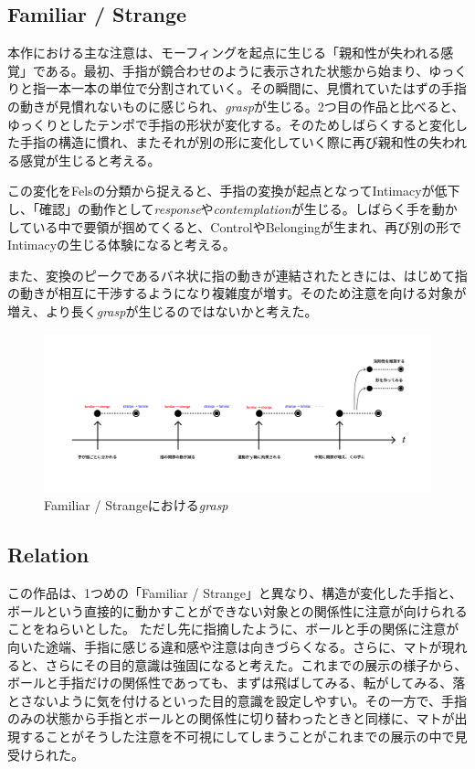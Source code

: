 \subsection*{Familiar / Strange}
本作における主な注意は、モーフィングを起点に生じる「親和性が失われる感覚」である。最初、手指が鏡合わせのように表示された状態から始まり、ゆっくりと指一本一本の単位で分割されていく。その瞬間に、見慣れていたはずの手指の動きが見慣れないものに感じられ、\textit{grasp}が生じる。2つ目の作品と比べると、ゆっくりとしたテンポで手指の形状が変化する。そのためしばらくすると変化した手指の構造に慣れ、またそれが別の形に変化していく際に再び親和性の失われる感覚が生じると考える。

この変化をFelsの分類から捉えると、手指の変換が起点となってIntimacyが低下し、「確認」の動作として\textit{response}や\textit{contemplation}が生じる。しばらく手を動かしている中で要領が掴めてくると、ControlやBelongingが生まれ、再び別の形でIntimacyの生じる体験になると考える。

また、変換のピークであるバネ状に指の動きが連結されたときには、はじめて指の動きが相互に干渉するようになり複雑度が増す。そのため注意を向ける対象が増え、より長く\textit{grasp}が生じるのではないかと考えた。

\begin{figure}[H]
  \centering
  \includegraphics[width=15cm]{img/grasp_familiar_strange.png}
  \caption{Familiar / Strangeにおける\textit{grasp}}
  \label{fig:grasp_familiar_strange}
\end{figure}

\subsection*{Relation}
この作品は、1つめの「Familiar / Strange」と異なり、構造が変化した手指と、ボールという直接的に動かすことができない対象との関係性に注意が向けられることをねらいとした。
ただし先に指摘したように、ボールと手の関係に注意が向いた途端、手指に感じる違和感や注意は向きづらくなる。さらに、マトが現れると、さらにその目的意識は強固になると考えた。これまでの展示の様子から、ボールと手指だけの関係性であっても、まずは飛ばしてみる、転がしてみる、落とさないように気を付けるといった目的意識を設定しやすい。その一方で、手指のみの状態から手指とボールとの関係性に切り替わったときと同様に、マトが出現することがそうした注意を不可視にしてしまうことがこれまでの展示の中で見受けられた。

